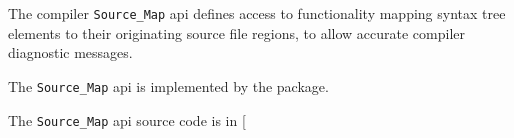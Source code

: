 
The compiler {\tt Source\_Map} api defines access to 
functionality mapping syntax tree elements 
to their originating source file regions, to allow accurate compiler diagnostic messages.

The {\tt Source\_Map} api is implemented by the  package.

The {\tt Source\_Map} api source code is in [

